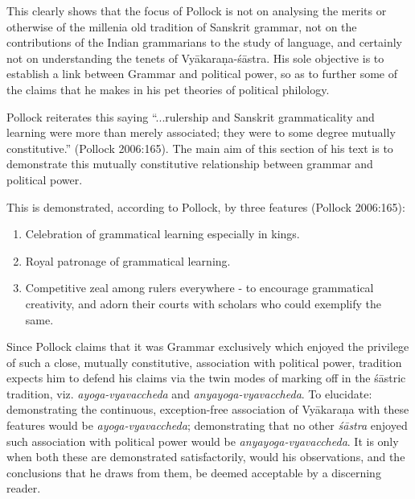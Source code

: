 \newpage

This clearly shows that the focus of Pollock is not on analysing the merits or otherwise of the millenia old tradition of Sanskrit grammar, not on the contributions of the Indian grammarians to the study of language, and certainly not on understanding the tenets of Vyākaraṇa-śāstra. His sole objective is to establish a link between Grammar and political power, so as to further some of the claims that he makes in his pet theories of political philology.

Pollock reiterates this saying ``...rulership and Sanskrit grammaticality and learning were more than merely associated; they were to some degree mutually constitutive.'' (Pollock 2006:165). The main aim of this section of his text is to demonstrate this mutually constitutive relationship between grammar and political power.

This is demonstrated, according to Pollock, by three features (Pollock 2006:165):
\begin{enumerate}
\item Celebration of grammatical learning especially in kings.
\item Royal patronage of grammatical learning.
\item Competitive zeal among rulers everywhere - to encourage grammatical creativity, and adorn their courts with scholars who could exemplify the same. 
\end{enumerate}

Since Pollock claims that it was Grammar exclusively which enjoyed the privilege of such a close, mutually constitutive, association with political power, tradition expects him to defend his claims via the twin modes of marking off in the śāstric tradition, viz. {\sl ayoga-vyavaccheda} and {\sl anyayoga-vyavaccheda}. To elucidate: demonstrating the continuous, exception-free association of Vyākaraṇa with these features would be {\sl ayoga-vyavaccheda}; demonstrating that no other {\sl śāstra} enjoyed such association with political power would be {\sl anyayoga-vyavaccheda}. It is only when both these are demonstrated satisfactorily, would his observations, and the conclusions that he draws from them, be deemed acceptable by a discerning reader. 

